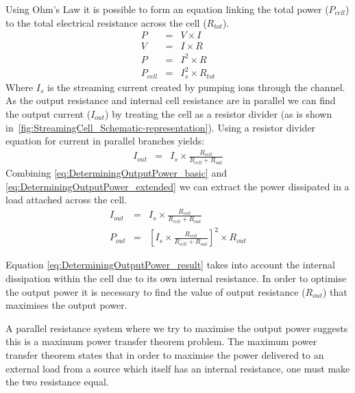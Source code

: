       Using Ohm's Law it is possible to form an equation linking the total power ($P_{cell}$) to the total electrical resistance across the cell ($R_{tot}$).
      \begin{eqnarray}
          P & = & V\times I\nonumber \\
          V & = & I\times R\nonumber \\
          P & = & I^{2}\times R\nonumber \\
          P_{cell} & = & I_{s}^{2}\times R_{tot}
          \label{eq:DeterminingOutputPower_basic}
      \end{eqnarray}
      Where $I_{s}$ is the streaming current created by pumping ions through the channel.
      As the output resistance and internal cell resistance are in parallel we can find the output current ($I_{out}$) by treating the cell as a resistor divider (as is shown in~\cref{fig:StreamingCell_Schematic-representation}).
      Using a resistor divider equation for current in parallel branches yields:
      \begin{eqnarray}
          I_{out} & = & I_{s}\times\frac{R_{cell}}{R_{cell}+R_{out}}
          \label{eq:DeterminingOutputPower_extended}
      \end{eqnarray}
      Combining \eqref{eq:DeterminingOutputPower_basic} and \eqref{eq:DeterminingOutputPower_extended} we can extract the power dissipated in a load attached across the cell.
      \begin{eqnarray}
          I_{out} & = & I_{s}\times\frac{R_{cell}}{R_{cell}+R_{out}}\nonumber \\
          P_{out} & = & \left[I_{s}\times\frac{R_{cell}}{R_{cell}+R_{out}}\right]^{2}\times R_{out}
          \label{eq:DeterminingOutputPower_result}
      \end{eqnarray}

      Equation \eqref{eq:DeterminingOutputPower_result} takes into account the internal dissipation within the cell due to its own internal resistance.
      In order to optimise the output power it is necessary to find the value of output resistance ($R_{out}$) that maximises the output power.

      A parallel resistance system where we try to maximise the output power suggests this is a maximum power transfer theorem problem.
      The maximum power transfer theorem states that in order to maximise the power delivered to an external load from a source which itself has an internal resistance, one must make the two resistance equal.


